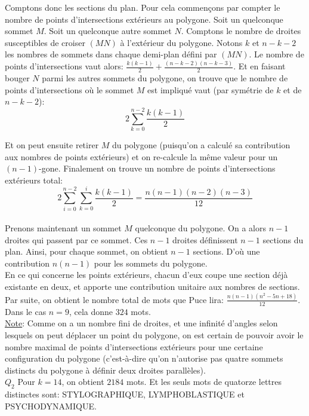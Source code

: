 \documentclass[11pt] {article}
\begin{document}
Comptons donc les sections du plan. Pour cela commençons par compter le nombre
de points d'intersections extérieurs au polygone. Soit un quelconque sommet $M$.
Soit un quelconque autre sommet $N$. Comptons le nombre de droites susceptibles
de croiser $(MN)$ à l'extérieur du polygone. Notons $k$ et $n-k-2$ les nombres
de sommets dans chaque demi-plan défini par $(MN)$. Le nombre de points
d'intersections vaut alors: $\frac{k(k-1)}{2} + \frac{(n-k-2)(n-k-3)}{2}$. Et en
faisant bouger $N$ parmi les autres sommets du polygone, on trouve que le nombre
de points d'intersections où le sommet $M$ est impliqué vaut (par symétrie de $k$
et de $n-k-2$):
\[ 2 \sum\limits_{k=0}^{n-2} \frac{k(k-1)}{2}\]

Et on peut ensuite retirer $M$ du polygone (puisqu'on a calculé sa contribution
aux nombres de points extérieurs) et on re-calcule la même valeur pour un 
$(n-1)$-gone. Finalement on trouve un nombre de points d'intersections extérieurs total:
\[2\sum\limits_{i=0}^{n-2} \sum\limits_{k=0}^i \frac{k(k-1)}{2} = \frac{n(n-1)(n-2)(n-3)}{12}\]\\

Prenons maintenant un sommet $M$ quelconque du polygone. On a alors $n-1$ droites
qui passent par ce sommet. Ces $n-1$ droites définissent $n-1$ sections du plan.
Ainsi, pour chaque sommet, on obtient $n-1$ sections. D'où une contribution
$n(n-1)$ pour les sommets du polygone.\\
En ce qui concerne les points extérieurs, chacun d'eux coupe une section déjà
existante en deux, et apporte une contribution unitaire aux nombres de sections.\\

Par suite, on obtient le nombre total de mots que Puce lira: $\frac{n(n-1)(n^2-5n+18)}{12}$.
Dans le cas $n=9$, cela donne $324$ mots.\\


\underline{Note}: Comme on a un nombre fini de droites, et une infinité d'angles selon lesquels
on peut déplacer un point du polygone, on est certain de pouvoir avoir le
nombre maximal de points d'intersections extérieurs pour une certaine configuration
du polygone (c'est-à-dire qu'on n'autorise pas quatre sommets distincts du polygone
à définir deux droites parallèles).\\

$Q_{2}$ Pour $k = 14$, on obtient $2184$ mots. Et les seuls mots de quatorze lettres
distinctes sont: STYLOGRAPHIQUE, LYMPHOBLASTIQUE et PSYCHODYNAMIQUE.
\end{document}
